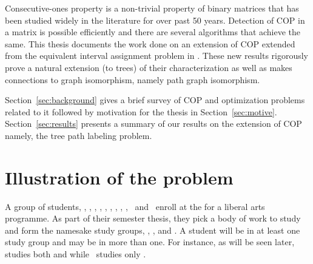 \documentclass[MS]             %
              {iitmdiss_as}    %
\begin{document}

   


Consecutive-ones property is a non-trivial property of binary matrices
that has been studied widely in the literature for over past 50
years. Detection of COP in a matrix is possible efficiently and there
are several algorithms that achieve the same. This thesis documents
the work done on an extension of COP extended from the equivalent
interval assignment problem in \cite{nsnrs09}. These new results
rigorously prove a natural extension (to trees) of their
characterization as well as makes connections to graph isomorphism,
namely path graph isomorphism.


Section~\ref{sec:background} gives a brief survey of COP and
optimization problems related to it followed by motivation for the
thesis in Section~\ref{sec:motive}.  Section~\ref{sec:results}
presents a summary of our results on the extension of COP namely, the
tree path labeling problem. 



\section{Illustration of the problem}
\label{sec:problem}

A group of students, \Pa, \Pi, \Sn, \Wo, \Vi, \Li, \Ch, \Sa, \Fr,
  \Sc\ and \Lu\ enroll at the
  {\WSI} for a liberal arts programme.  As part of their semester
  thesis, they pick a body of work to study and form the namesake
  study groups, {\LLL}, {\GGG}, {\BBB} and {\TTT}. A student will be in at least one study
  group and may be in more than one. For instance, as will be seen
  later, {\Fr} studies both {\LLL} and {\TTT} while \Wo\ studies only
  \BBB.
\end{document}
